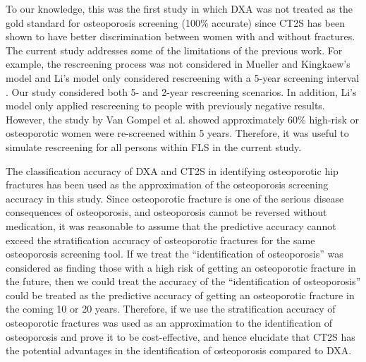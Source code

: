 To our knowledge, this was the first study in which DXA was not treated as the gold standard for osteoporosis screening (100\% accurate) since CT2S has been shown to have better discrimination between women with and without fractures. The current study addresses some of the limitations of the previous work. For example, the rescreening process was not considered in Mueller and Kingkaew's model \cite{4-75,4-77} and Li's model only considered rescreening with a 5-year screening interval \cite{4-45}. Our study considered both 5- and 2-year rescreening scenarios. In addition, Li's model only applied rescreening to people with previously negative results. However, the study by Van Gompel et al. \cite{4-19} showed approximately 60\% high-risk or osteoporotic women were re-screened within 5 years. Therefore, it was useful to simulate rescreening for all persons within FLS in the current study.

The classification accuracy of DXA and CT2S in identifying osteoporotic hip fractures has been used as the approximation of the osteoporosis screening accuracy in this study. Since osteoporotic fracture is one of the serious disease consequences of osteoporosis, and osteoporosis cannot be reversed without medication, it was reasonable to assume that the predictive accuracy cannot exceed the stratification accuracy of osteoporotic fractures for the same osteoporosis screening tool. If we treat the ``identification of osteoporosis'' was considered as finding those with a high risk of getting an osteoporotic fracture in the future, then we could treat the accuracy of the ``identification of osteoporosis'' could be treated as the predictive accuracy of getting an osteoporotic fracture in the coming 10 or 20 years. Therefore, if we use the stratification accuracy of osteoporotic fractures was used as an approximation to the identification of osteoporosis and prove it to be cost-effective, and hence elucidate that CT2S has the potential advantages in the identification of osteoporosis compared to DXA. 

